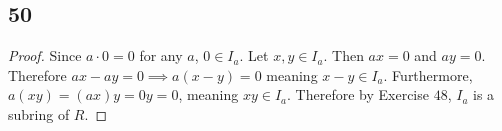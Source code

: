 \documentclass[12pt,titlepage]{extarticle}
\begin{document}
\subsection*{50}
\begin{proof}
    Since $a\cdot 0 = 0$ for any $a$, $0 \in I_a$. Let $x,y \in I_a$. Then $ax = 0$ and $ay = 0$. Therefore $ax - ay = 0 \implies a(x-y) = 0$ meaning $x-y \in I_a$. Furthermore, $a(xy) = (ax)y = 0y = 0$, meaning $xy \in I_a$. Therefore by Exercise $48$, $I_a$ is a subring of $R$.
\end{proof}
\end{document}
